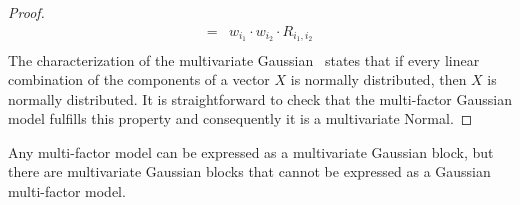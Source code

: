\documentclass[11pt,fleqn]{book} %
\begin{document}
\begin{proof}
\begin{displaymath}
\begin{array}{rl}
			=                                         & w_{i_1} \cdot w_{i_2} \cdot R_{i_1,i_2}                                                                    \\
		\end{array}
	\end{displaymath}
	The characterization of the multivariate Gaussian~\cite[thm. 2.6.2]{anderson:1984}
	states that if every linear combination of the components of a 
	vector $X$ is normally distributed, then $X$ is normally distributed.
	It is straightforward to check that the multi-factor Gaussian model 
	fulfills this property and consequently it is a multivariate Normal.
\end{proof}

\begin{proposition}
	Any multi-factor model can be expressed as a multivariate Gaussian 
	block, but there are multivariate Gaussian blocks that cannot be 
	expressed as a Gaussian multi-factor model.
\end{proposition}
\end{document}
